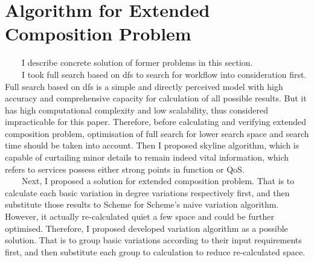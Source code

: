 \documentclass[senior,final,11pt]{iscs-thesis}
\begin{document}
\section{Algorithm for Extended Composition Problem} %

~~~~I describe concrete solution of former problems in this section.\\
~~~~I took full search based on dfs to search for workflow into consideration first. Full search based on dfs is a simple and directly perceived model with high accuracy and comprehensive capacity for calculation of all possible results. But it has high computational complexity and low scalability, thus considered impracticable for this paper. Therefore, before calculating and verifying extended composition problem, optimisation of full search for lower search space and search time should be taken into account. Then I proposed skyline algorithm, which is capable of curtailing minor details to remain indeed vital information, which refers to services possess either strong points in function or QoS. \\
~~~~Next, I proposed a solution for extended composition problem. That is to calculate each basic variation in degree variations respectively first, and then substitute those results to Scheme for Scheme's naive variation algorithm. However, it actually re-calculated quiet a few space and could be further optimised. Therefore, I proposed developed variation algorithm as a possible solution. That is to group basic variations according to their input requirements first,  and then substitute each group to calculation to reduce re-calculated space. \\
\end{document}
